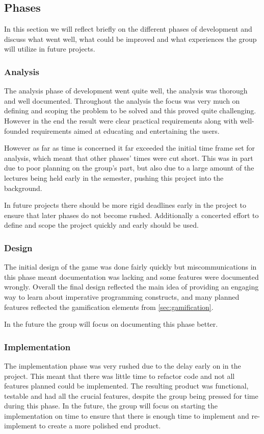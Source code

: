 \subsection{Phases}
In this section we will reflect briefly on the different phases of development and discuss what went well, what could be improved and what experiences the group will utilize in future projects.

\subsubsection{Analysis}

The analysis phase of development went quite well, the analysis was thorough and well documented. Throughout the analysis the focus was very much on defining and scoping the problem to be solved and this proved quite challenging. However in the end the result were clear practical requirements along with well-founded requirements aimed at educating and entertaining the users. 

However as far as time is concerned it far exceeded the initial time frame set for analysis, which meant that other phases' times were cut short. This was in part due to poor planning on the group's part, but also due to a large amount of the lectures being held early in the semester, pushing this project into the background.

In future projects there should be more rigid deadlines early in the project to ensure that later phases do not become rushed. Additionally a concerted effort to define and scope the project quickly and early should be used.

\subsubsection{Design}

The initial design of the game was done fairly quickly but miscommunications in this phase meant documentation was lacking and some features were documented wrongly. Overall the final design reflected the main idea of providing an engaging way to learn about imperative programming constructs, and many planned features reflected the gamification elements from \autoref{sec:gamification}.

In the future the group will focus on documenting this phase better.

\subsubsection{Implementation}
The implementation phase was very rushed due to the delay early on in the project. This meant that there was little time to refactor code and not all features planned could be implemented. The resulting product was functional, testable and had all the crucial features, despite the group being pressed for time during this phase. In the future, the group will focus on starting the implementation on time to ensure that there is enough time to implement and re-implement to create a more polished end product.